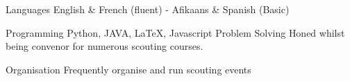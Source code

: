 

\begin{cvskills}

\cvskill
  {Languages} %
  {{English \& French (fluent) - Afikaans \& Spanish (Basic) }} %

\cvskill
  {Programming} %
  {Python, JAVA, LaTeX, Javascript} %
\cvskill
  {Problem Solving} %
  {Honed whilst being convenor for numerous scouting courses.} %


\cvskill
  {Organisation} %
  {Frequently organise and run scouting events} %


\end{cvskills}


